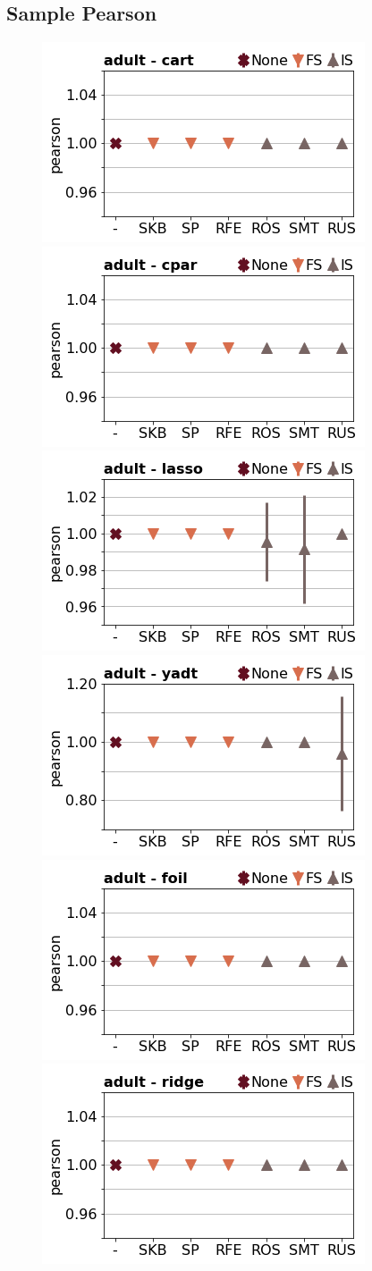 \documentclass[runningheads,a4paper]{llncs}
\begin{document}
\clearpage

\subsection{Sample Pearson}

\begin{figure}[!h]
\includegraphics[width=0.32\linewidth]{fig/preps_adult_DT_sklearn_sample_pearson.png}
\includegraphics[width=0.32\linewidth]{fig/preps_adult_RB_cpar_sample_pearson.png}
\includegraphics[width=0.32\linewidth]{fig/preps_adult_LM_lasso_sample_pearson.png}
\includegraphics[width=0.32\linewidth]{fig/preps_adult_DT_yadt_sample_pearson.png}
\includegraphics[width=0.32\linewidth]{fig/preps_adult_RB_foil_sample_pearson.png}
\includegraphics[width=0.32\linewidth]{fig/preps_adult_LM_ridge_sample_pearson.png}
\end{figure}
\end{document}
